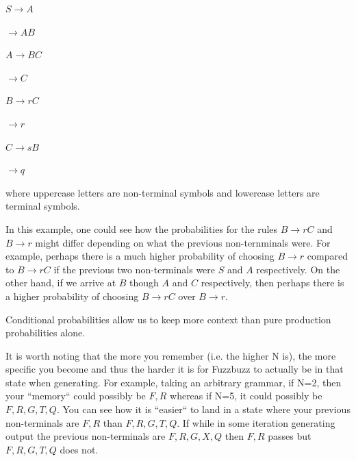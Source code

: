 \begin{center}
$S \rightarrow A$
\end{center}
\begin{center}
$\rightarrow A B$
\end{center}

\begin{center}
$A \rightarrow B C$
\end{center}
\begin{center}
$\rightarrow C$
\end{center}

\begin{center}
$B \rightarrow r C$
\end{center}
\begin{center}
$\rightarrow r$
\end{center}

\begin{center}
$C \rightarrow s B$
\end{center}
\begin{center}
$\rightarrow q$
\end{center}

where uppercase letters are non-terminal symbols and lowercase letters are
terminal symbols.


In this example, one could see how the probabilities for the rules $B
\rightarrow rC$ and $B \rightarrow r$ might differ depending on what the
previous non-ternminals were. For example, perhaps there is a much higher
probability of choosing $B \rightarrow r$ compared to $B \rightarrow rC$ if the
previous two non-terminals were $S$ and $A$ respectively. On the other hand, if
we arrive at $B$ though $A$ and $C$ respectively, then perhaps there is a
higher probability of choosing $B \rightarrow rC$ over $B \rightarrow r$.

Conditional probabilities allow us to keep more context than pure production
probabilities alone.

It is worth noting that the more you remember (i.e. the higher N is), the more
specific you become and thus the harder it is for Fuzzbuzz to actually be in
that state when generating. For example, taking an arbitrary grammar, if N=2,
then your ``memory`` could possibly be $F, R$ whereas if N=5, it could possibly
be $F, R, G, T, Q$. You can see how it is ``easier`` to land in a state where
your previous non-terminals are $F, R$ than $F, R, G, T, Q$. If while in some
iteration generating output the previous non-terminals are $F, R, G, X, Q$ then
$F, R$ passes but $F, R, G, T, Q$ does not.

